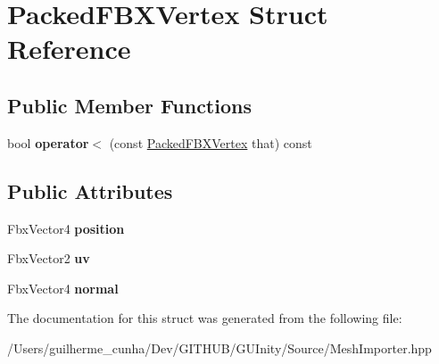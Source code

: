 \hypertarget{struct_packed_f_b_x_vertex}{}\section{Packed\+F\+B\+X\+Vertex Struct Reference}
\label{struct_packed_f_b_x_vertex}
\subsection*{Public Member Functions}
\begin{DoxyCompactItemize}
\item 
\hypertarget{struct_packed_f_b_x_vertex_a1ba1197fe8f7af21b7101103efc8df3c}{}bool {\bfseries operator$<$} (const \hyperlink{struct_packed_f_b_x_vertex}{Packed\+F\+B\+X\+Vertex} that) const \label{struct_packed_f_b_x_vertex_a1ba1197fe8f7af21b7101103efc8df3c}

\end{DoxyCompactItemize}
\subsection*{Public Attributes}
\begin{DoxyCompactItemize}
\item 
\hypertarget{struct_packed_f_b_x_vertex_abe1bcb951c649572cf51651919478d2d}{}Fbx\+Vector4 {\bfseries position}\label{struct_packed_f_b_x_vertex_abe1bcb951c649572cf51651919478d2d}

\item 
\hypertarget{struct_packed_f_b_x_vertex_a2dd7a654090fb00ef766d4800b82032c}{}Fbx\+Vector2 {\bfseries uv}\label{struct_packed_f_b_x_vertex_a2dd7a654090fb00ef766d4800b82032c}

\item 
\hypertarget{struct_packed_f_b_x_vertex_a524a5cd20f3df4b5c8e9b11880444819}{}Fbx\+Vector4 {\bfseries normal}\label{struct_packed_f_b_x_vertex_a524a5cd20f3df4b5c8e9b11880444819}

\end{DoxyCompactItemize}


The documentation for this struct was generated from the following file\+:\begin{DoxyCompactItemize}
\item 
/\+Users/guilherme\+\_\+cunha/\+Dev/\+G\+I\+T\+H\+U\+B/\+G\+U\+Inity/\+Source/Mesh\+Importer.\+hpp\end{DoxyCompactItemize}

